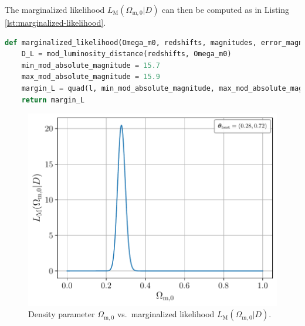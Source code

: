 \noindent The marginalized likelihood $L_{\text{M}}(\Omega_{\text{m},0} \vert D)$ can then be computed as in Listing \ref{lst:marginalized-likelihood}.

\begin{lstlisting}[language=Python, caption={Function for the marginalized likelihood $L_{\text{M}}(\Omega_{\text{m},0} \vert D)$.}, label={lst:marginalized-likelihood}]
def marginalized_likelihood(Omega_m0, redshifts, magnitudes, error_magnitudes, L0):
    D_L = mod_luminosity_distance(redshifts, Omega_m0)
    min_mod_absolute_magnitude = 15.7
    max_mod_absolute_magnitude = 15.9
    margin_L = quad(l, min_mod_absolute_magnitude, max_mod_absolute_magnitude, args=(D_L, magnitudes, error_magnitudes, L0))[0]
    return margin_L
\end{lstlisting}

\begin{figure}[H]
    \begin{minipage}{8cm}
        \centering
        \includegraphics[scale=0.52]{figures/plots/PDF/MWE-marginalized-likelihood.pdf}
        \caption{Density parameter $\Omega_{\text{m},0}$ vs.\ marginalized likelihood $L_{\text{M}}(\Omega_{\text{m},0} \vert D)$.}
        \label{fig:MWE-marginalized-likelihood}
    \end{minipage}
    \hspace*{1cm}
    \begin{minipage}{8cm}
        \centering

\end{minipage}
\end{figure}
